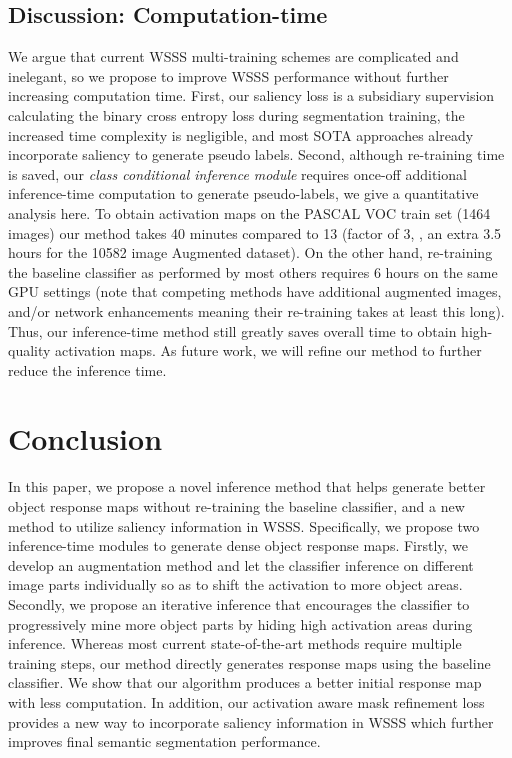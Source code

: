 \documentclass[10pt,twocolumn,letterpaper]{article}
\begin{document}
\subsection{Discussion: Computation-time}
We argue that current WSSS multi-training schemes are complicated and inelegant, so we propose to improve WSSS performance without further increasing computation time.
First, our saliency loss is a subsidiary supervision calculating the binary cross entropy loss during segmentation training, the increased time complexity is negligible, and most SOTA approaches already incorporate saliency to generate pseudo labels. 
Second, although re-training time is saved,
our \emph{class conditional inference module} requires once-off additional inference-time computation to generate pseudo-labels,
we give a quantitative analysis here. 
To obtain activation maps on the PASCAL VOC train set (1464 images) our method takes 40 minutes compared to 13 (factor of 3, \eg, 
an extra 3.5 hours for the 10582 image Augmented dataset).
On the other hand, re-training the baseline classifier as performed by most others 
requires 6 hours on the same GPU settings (note that competing methods have additional augmented images, and/or network enhancements meaning their re-training takes at least this long). 
Thus, our inference-time method still greatly saves overall time to obtain high-quality activation maps.
As future work, we will refine our method to further reduce the inference time.

\vspace{-2mm}
\section{Conclusion}
In this paper, we propose a novel inference method that helps generate better object response maps without re-training the baseline classifier, and a new method to utilize saliency information in WSSS.
Specifically,
we propose two inference-time modules to generate dense
object response maps.
Firstly, we develop an augmentation method and let the classifier
inference on different image parts individually so as to shift the activation to more object areas.
Secondly, we propose an iterative inference that encourages the classifier to progressively mine more object parts by hiding high activation areas during inference.
Whereas
most current state-of-the-art methods 
require multiple training steps, our method directly generates response maps using the baseline classifier.
We show that our algorithm produces a better initial response map with less computation.
In addition, our activation aware mask refinement loss provides a new way to incorporate saliency information in WSSS
which further improves final semantic segmentation performance.



{\small


}
\end{document}
